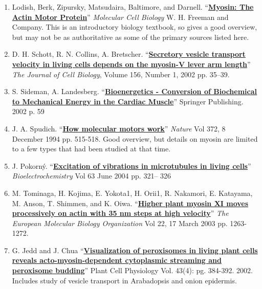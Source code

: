 \documentclass{../lab}
\begin{document}
\begin{enumerate}
    \item Lodish, Berk, Zipursky, Matsudaira, Baltimore, and Darnell. ``\href{http://physics111.lib.berkeley.edu/Physics111/Reprints/BMC/BMC\_Reprints/MyosinActinMotor.htm}{\textbf{Myosin: The Actin Motor Protein}}'' \emph{Molecular Cell Biology} W. H. Freeman and Company. This is an introductory biology textbook, so gives a good overview, but may not be as authoritative as some of the primary sources listed here.

    \item D. H. Schott, R. N. Collins, A. Bretscher. ``\href{http://physics111.lib.berkeley.edu/Physics111/Reprints/BMC/BMC\_Reprints/SecretoryVesicle-Schott.pdf}{\textbf{Secretory vesicle transport velocity in living cells depends on the myosin-V lever arm length}}'' \emph{The Journal of Cell Biology}, Volume 156, Number 1, 2002 pp. 35–39.
    
    \item S. Sideman, A. Landesberg. ``\href{http://physics111.lib.berkeley.edu/Physics111/Reprints/BMC/BMC\_Reprints/BioenergeticsLandesberg.pdf}{\textbf{Bioenergetics - Conversion of Biochemical to Mechanical Energy in the Cardiac Muscle}}'' Springer Publishing. 2002 p. 59

    \item J. A. Spudich. ``\href{http://physics111.lib.berkeley.edu/Physics111/Reprints/BMC/BMC\_Reprints/MolecularMotrs372515a0.pdf}{\textbf{How molecular motors work}}'' \emph{Nature} Vol 372, 8 December 1994 pp. 515-518. Good overview, but details on myosin are limited to a few types that had been studied at that time. 

    \item J. Pokorný. ``\href{http://physics111.lib.berkeley.edu/Physics111/Reprints/BMC/BMC\_Reprints/Langevin\_On\_the\_Theory\_of\_Brownian\_Motion.pdf}{\textbf{Excitation of vibrations in microtubules in living cells}}'' \emph{Bioelectrochemistry} Vol 63 June 2004 pp. 321– 326

    \item M. Tominaga, H. Kojima, E. Yokota1, H. Orii1, R. Nakamori, E. Katayama, M. Anson, T. Shimmen, and K. Oiwa. ``\href{http://physics111.lib.berkeley.edu/Physics111/Reprints/BMC/BMC\_Reprints/HigherPlantMyosin7595042a.pdf}{\textbf{Higher plant myosin XI moves processively on actin with 35 nm steps at high velocity}}'' \emph{The European Molecular Biology Organization} Vol 22, 17 March 2003 pp. 1263-1272. 

    \item G. Jedd and J. Chua ``\href{http://physics111.lib.berkeley.edu/Physics111/Reprints/BMC/BMC\_Reprints/VisualPeroxisomes384.pdf}{\textbf{Visualization of peroxisomes in living plant cells reveals acto-myosin-dependent cytoplasmic streaming and peroxisome budding}}'' Plant Cell Physiology Vol. 43(4): pg. 384-392. 2002. Includes study of vesicle transport in Arabadopsis and onion epidermis. 


\end{enumerate}
\end{document}
